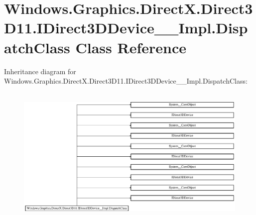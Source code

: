 \hypertarget{class_windows_1_1_graphics_1_1_direct_x_1_1_direct3_d11_1_1_i_direct3_d_device_____impl_1_1_dispatch_class}{}\section{Windows.\+Graphics.\+Direct\+X.\+Direct3\+D11.\+I\+Direct3\+D\+Device\+\_\+\+\_\+\+Impl.\+Dispatch\+Class Class Reference}
\label{class_windows_1_1_graphics_1_1_direct_x_1_1_direct3_d11_1_1_i_direct3_d_device_____impl_1_1_dispatch_class}
Inheritance diagram for Windows.\+Graphics.\+Direct\+X.\+Direct3\+D11.\+I\+Direct3\+D\+Device\+\_\+\+\_\+\+Impl.\+Dispatch\+Class\+:\begin{figure}[H]
\begin{center}
\leavevmode
\includegraphics[height=6.739606cm]{class_windows_1_1_graphics_1_1_direct_x_1_1_direct3_d11_1_1_i_direct3_d_device_____impl_1_1_dispatch_class}
\end{center}
\end{figure}

